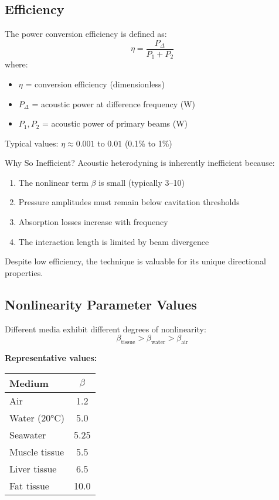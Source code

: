 \subsection{Efficiency}

The power conversion efficiency is defined as:
\begin{equation}
\eta = \frac{P_\Delta}{P_1 + P_2}
\end{equation}
where:
\begin{itemize}
\item $\eta$ = conversion efficiency (dimensionless)
\item $P_\Delta$ = acoustic power at difference frequency (W)
\item $P_1, P_2$ = acoustic power of primary beams (W)
\end{itemize}

Typical values: $\eta \approx 0.001$ to $0.01$ (0.1\% to 1\%)

\begin{calloutbox}{Why So Inefficient?}
Acoustic heterodyning is inherently inefficient because:
\begin{enumerate}
\item The nonlinear term $\beta$ is small (typically 3--10)
\item Pressure amplitudes must remain below cavitation thresholds
\item Absorption losses increase with frequency
\item The interaction length is limited by beam divergence
\end{enumerate}
Despite low efficiency, the technique is valuable for its unique directional properties.
\end{calloutbox}

\subsection{Nonlinearity Parameter Values}

Different media exhibit different degrees of nonlinearity:
\begin{equation}
\beta_{\text{tissue}} > \beta_{\text{water}} > \beta_{\text{air}}
\end{equation}

\textbf{Representative values:}

\begin{center}
\begin{tabular}{@{}lc@{}}
\toprule
\textbf{Medium} & $\beta$ \\
\midrule
Air & 1.2 \\
Water (20°C) & 5.0 \\
Seawater & 5.25 \\
Muscle tissue & 5.5 \\
Liver tissue & 6.5 \\
Fat tissue & 10.0 \\
\bottomrule
\end{tabular}
\end{center}


